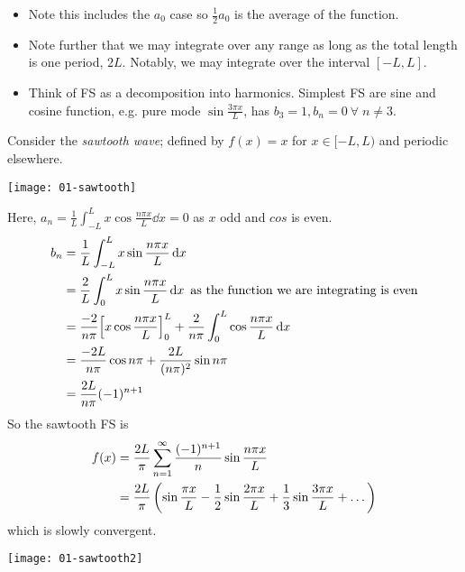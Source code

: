     \begin{note}
        \begin{itemize}
            \item  Note this includes the $a_0$ case so $\frac{1}{2} a_0$ is the average of the function.
            \item Note further that we may integrate over any range as long as the total length is one period, $2L$.
            Notably, we may integrate over the interval $[-L, L]$.
            \item Think of FS as a decomposition into harmonics.
            Simplest FS are sine and cosine function, e.g. pure mode $\sin \frac{3 \pi x}{L}$, has $b_3 = 1, b_n = 0 \ \forall \; n \neq 3$.
        \end{itemize} 
    \end{note} 

    \begin{example}
        Consider the \textit{sawtooth wave}; defined by $f(x) = x$ for $x \in [-L, L)$ and periodic elsewhere.
        {\par \centering \texttt{[image: 01-sawtooth]} \par}
        Here,
        $a_n = \frac{1}{L} \int_{-L}^L x \cos \frac{n\pi x}{L} \dd{x} = 0$ as $x$ odd and $cos$ is even.
        \begin{align*}
            b_n &= \frac{1}{L} \int_{-L}^L x \sin \frac{n\pi x}{L} \dd{x} \\
            &= \frac{2}{L} \int_0^L x \sin \frac{n\pi x}{L} \dd{x} \text{ as the function we are integrating is even} \\
            &= \frac{-2}{n\pi} \qty[x \cos \frac{n\pi x}{L}]_0^L + \frac{2}{n\pi} \int_0^L \cos \frac{n \pi x}{L} \dd{x} \\
            &= \frac{-2L}{n\pi} \cos n \pi + \frac{2L}{(n\pi)^2} \sin n \pi \\
            &= \frac{2L}{n\pi} (-1)^{n+1}
        \end{align*}
        So the sawtooth FS is
        \begin{align}
            f(x) &= \frac{2L}{\pi} \sum_{n=1}^{\infty} \frac{(-1)^{n+1}}{n} \sin \frac{n \pi x}{L} \\
            &= \frac{2L}{\pi} \left( \sin \frac{\pi x}{L} - \frac{1}{2} \sin \frac{2 \pi x}{L} + \frac{1}{3} \sin \frac{3 \pi x}{L} + \dots \right) \notag
        \end{align} 
        which is slowly convergent.
        {\par \centering \texttt{[image: 01-sawtooth2]} \par}
    \end{example}

